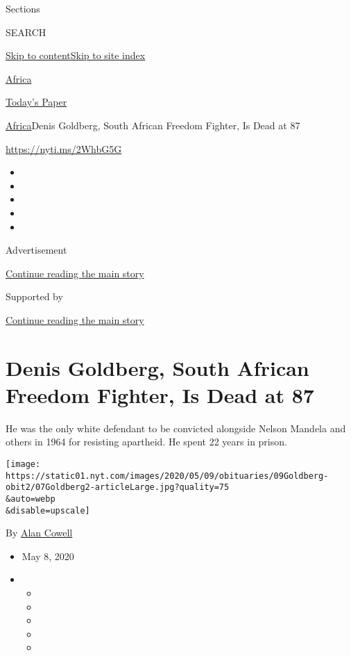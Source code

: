 Sections

SEARCH

\protect\hyperlink{site-content}{Skip to
content}\protect\hyperlink{site-index}{Skip to site index}

\href{https://www.nytimes.com/section/world/africa}{Africa}

\href{https://myaccount.nytimes.com/auth/login?response_type=cookie\&client_id=vi}{}

\href{https://www.nytimes.com/section/todayspaper}{Today's Paper}

\href{/section/world/africa}{Africa}\textbar{}Denis Goldberg, South
African Freedom Fighter, Is Dead at 87

\url{https://nyti.ms/2WhbG5G}

\begin{itemize}
\item
\item
\item
\item
\item
\end{itemize}

Advertisement

\protect\hyperlink{after-top}{Continue reading the main story}

Supported by

\protect\hyperlink{after-sponsor}{Continue reading the main story}

\hypertarget{denis-goldberg-south-african-freedom-fighter-is-dead-at-87}{%
\section{Denis Goldberg, South African Freedom Fighter, Is Dead at
87}\label{denis-goldberg-south-african-freedom-fighter-is-dead-at-87}}

He was the only white defendant to be convicted alongside Nelson Mandela
and others in 1964 for resisting apartheid. He spent 22 years in prison.

\texttt{[image: https://static01.nyt.com/images/2020/05/09/obituaries/09Goldberg-obit2/07Goldberg2-articleLarge.jpg?quality=75\\\&auto=webp\\\&disable=upscale]}

By \href{https://www.nytimes.com/by/alan-cowell}{Alan Cowell}

\begin{itemize}
\item
  May 8, 2020
\item
  \begin{itemize}
  \item
  \item
  \item
  \item
  \item
  \end{itemize}
\end{itemize}

